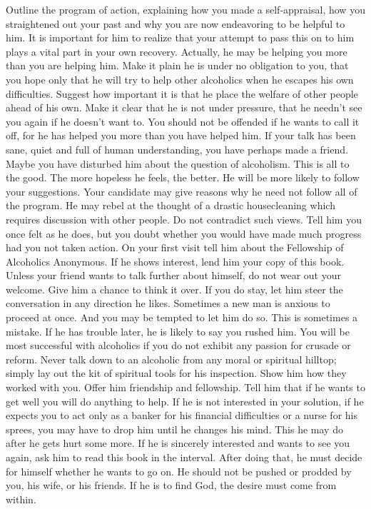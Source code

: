 \begin{biblechapter}
Outline the program of action, explaining how you made a self-appraisal, how you straightened out your past and why you are now endeavoring to be helpful to him.  It is important for him to realize that your attempt to pass this on to him plays a vital part in your own recovery.  Actually, he may be helping you more than you are helping him.  Make it plain he is under no obligation to you, that you hope only that he will try to help other alcoholics when he escapes his own difficulties.  Suggest how important it is that he place the welfare of other people ahead of his own.  Make it clear that he is not under pressure, that he needn't see you again if he doesn't want to.  You should not be offended if he wants to call it off, for he has helped you more than you have helped him.  If your talk has been sane, quiet and full of human understanding, you have perhaps made a friend.  Maybe you have disturbed him about the question of alcoholism.  This is all to the good.  The more hopeless he feels, the better.  He will be more likely to follow your suggestions.
Your candidate may give reasons why he need not follow all of the program.  He may rebel at the thought of a drastic housecleaning which requires discussion with other people.  Do not contradict such views.  Tell him you once felt as he does, but you doubt whether you would have made much progress had you not taken action.  On your first visit tell him about the Fellowship of Alcoholics Anonymous.  If he shows interest, lend him your copy of this book.
Unless your friend wants to talk further about himself, do not wear out your welcome.  Give him a chance to think it over.  If you do stay, let him steer the conversation in any direction he likes.  Sometimes a new man is anxious to proceed at once. And you may be tempted to let him do so.  This is sometimes a mistake.  If he has trouble later, he is likely to say you rushed him.  You will be most successful with alcoholics if you do not exhibit any passion for crusade or reform.  Never talk down to an alcoholic from any moral or spiritual hilltop; simply lay out the kit of spiritual tools for his inspection.  Show him how they worked with you.  Offer him friendship and fellowship.  Tell him that if he wants to get well you will do anything to help.
If he is not interested in your solution, if he expects you to act only as a banker for his financial difficulties or a nurse for his sprees, you may have to drop him until he changes his mind.  This he may do after he gets hurt some more.
If he is sincerely interested and wants to see you again, ask him to read this book in the interval.  After doing that, he must decide for himself whether he wants to go on.  He should not be pushed or prodded by you, his wife, or his friends.  If he is to find God, the desire must come from within.

\end{biblechapter}

